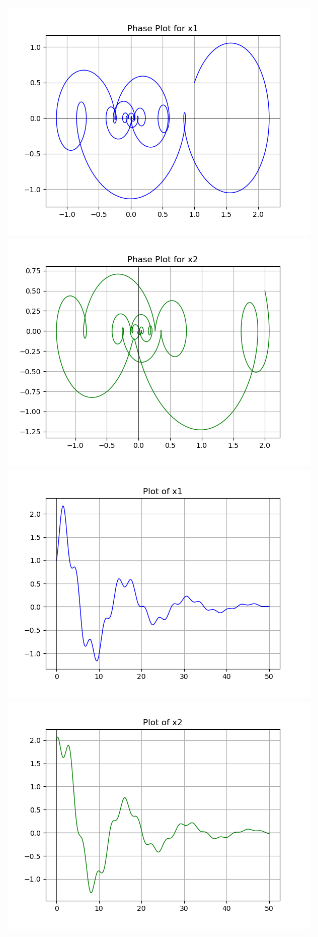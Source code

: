 \documentclass[12pt]{article}
\begin{document}
\begin{center}
    \includegraphics[height=6cm]{G2_4a.png}\hspace*{\fill}
    \includegraphics[height=6cm]{G2_4b.png}\\
    \includegraphics[height=6cm]{G2_4c.png}\hspace*{\fill}
    \includegraphics[height=6cm]{G2_4d.png}\\

\end{center}
\end{document}
